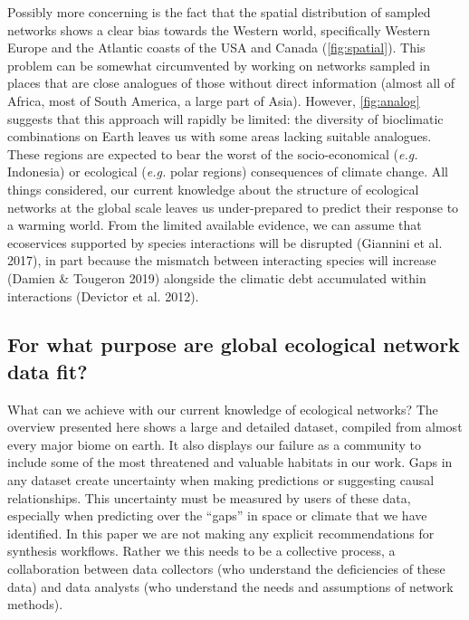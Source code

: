 Possibly more concerning is the fact that the spatial distribution of
sampled networks shows a clear bias towards the Western world,
specifically Western Europe and the Atlantic coasts of the USA and
Canada (\cref{fig:spatial}). This problem can be somewhat circumvented
by working on networks sampled in places that are close analogues of
those without direct information (almost all of Africa, most of South
America, a large part of Asia). However, \ref{fig:analog} suggests that
this approach will rapidly be limited: the diversity of bioclimatic
combinations on Earth leaves us with some areas lacking suitable
analogues. These regions are expected to bear the worst of the
socio-economical (\emph{e.g.} Indonesia) or ecological (\emph{e.g.}
polar regions) consequences of climate change. All things considered,
our current knowledge about the structure of ecological networks at the
global scale leaves us under-prepared to predict their response to a
warming world. From the limited available evidence, we can assume that
ecoservices supported by species interactions will be disrupted
(Giannini et al. 2017), in part because the mismatch between interacting
species will increase (Damien \& Tougeron 2019) alongside the climatic
debt accumulated within interactions (Devictor et al. 2012).

\hypertarget{for-what-purpose-are-global-ecological-network-data-fit}{%
\subsection{For what purpose are global ecological network data
fit?}\label{for-what-purpose-are-global-ecological-network-data-fit}}

What can we achieve with our current knowledge of ecological networks?
The overview presented here shows a large and detailed dataset, compiled
from almost every major biome on earth. It also displays our failure as
a community to include some of the most threatened and valuable habitats
in our work. Gaps in any dataset create uncertainty when making
predictions or suggesting causal relationships. This uncertainty must be
measured by users of these data, especially when predicting over the
``gaps'' in space or climate that we have identified. In this paper we
are not making any explicit recommendations for synthesis workflows.
Rather we this needs to be a collective process, a collaboration between
data collectors (who understand the deficiencies of these data) and data
analysts (who understand the needs and assumptions of network methods).

